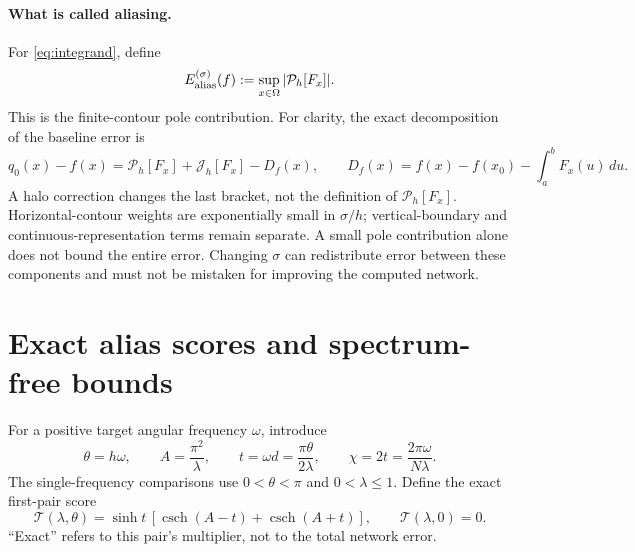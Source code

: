 \documentclass[11pt]{article}
\theoremstyle{definition}\newtheorem{definition}[theorem]{Definition}
\theoremstyle{remark}\newtheorem{remark}[theorem]{Remark}
\numberwithin{equation}{section}
\DeclareMathOperator{\csch}{csch}
\newcommand{\T}{\mathcal T}
\newcommand{\Perr}{\mathcal P_h}
\newcommand{\Jerr}{\mathcal J_h}
\begin{document}
\paragraph{What is called aliasing.}
For \eqref{eq:integrand}, define
\begin{equation}
 E_{\rm alias}^{(\sigma)}(f):=
 \sup_{x\in\Omega}|\Perr[F_x]|.
 \label{eq:alias-definition}
\end{equation}
This is the finite-contour pole contribution. For clarity, the exact decomposition of the baseline error is
\begin{equation}
 q_0(x)-f(x)
 =\Perr[F_x]+\Jerr[F_x]-D_f(x),\qquad
 D_f(x)=f(x)-f(x_0)-\int_a^bF_x(u)\,du.
 \label{eq:full-decomposition}
\end{equation}
A halo correction changes the last bracket, not the definition of $\Perr[F_x]$. Horizontal-contour weights are exponentially small in $\sigma/h$; vertical-boundary and continuous-representation terms remain separate. A small pole contribution alone does not bound the entire error. Changing $\sigma$ can redistribute error between these components and must not be mistaken for improving the computed network.

\section{Exact alias scores and spectrum-free bounds}
\label{sec:poles}
For a positive target angular frequency $\omega$, introduce
\begin{equation}
 \theta=h\omega,\qquad A=\frac{\pi^2}{\lambda},\qquad
 t=\omega d=\frac{\pi\theta}{2\lambda},\qquad
 \chi=2t=\frac{2\pi\omega}{N\lambda}.
 \label{eq:angles}
\end{equation}
The single-frequency comparisons use $0<\theta<\pi$ and $0<\lambda\le1$. Define the exact first-pair score
\begin{equation}
 \boxed{\T(\lambda,\theta)=
 \sinh t\,[\csch(A-t)+\csch(A+t)],\qquad \T(\lambda,0)=0.}
 \label{eq:T}
\end{equation}
``Exact'' refers to this pair's multiplier, not to the total network error.
\end{document}
